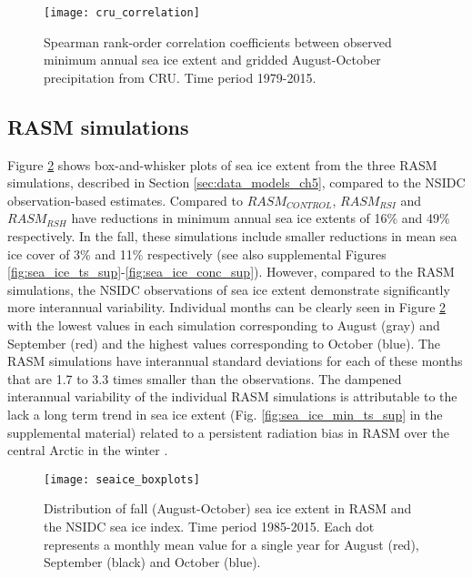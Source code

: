 \begin{figure}
  \centering
  \texttt{[image: cru\_correlation]}
  \caption{Spearman rank-order correlation coefficients between observed minimum annual sea ice extent and gridded August-October precipitation from CRU. Time period 1979-2015.}
  \label{fig:prec_spatial_corr}
\end{figure}

\subsection{RASM simulations}
\label{sec:rasm_results}

Figure \ref{fig:sea_ice_box} shows box-and-whisker plots of sea ice extent from the three RASM simulations, described in Section \ref{sec:data_models_ch5}, compared to the NSIDC observation-based estimates.
Compared to $RASM_{CONTROL}$, $RASM_{RSI}$ and $RASM_{RSH}$ have reductions in minimum annual sea ice extents of 16\% and 49\% respectively.
In the fall, these simulations include smaller reductions in mean sea ice cover of 3\% and 11\% respectively (see also supplemental Figures \ref{fig:sea_ice_ts_sup}-\ref{fig:sea_ice_conc_sup}). %
However, compared to the RASM simulations, the NSIDC observations of sea ice extent demonstrate significantly more interannual variability.
Individual months can be clearly seen in Figure \ref{fig:sea_ice_box} with the lowest values in each simulation corresponding to August (gray) and September (red) and the highest values corresponding to October (blue).
The RASM simulations have interannual standard deviations for each of these months that are 1.7 to 3.3 times smaller than the observations.
The dampened interannual variability of the individual RASM simulations is attributable to the lack a long term trend in sea ice extent (Fig. \ref{fig:sea_ice_min_ts_sup} in the supplemental material) related to a persistent radiation bias in RASM over the central Arctic in the winter \citep{Cassano_2016}.

\begin{figure}
  \centering
  \texttt{[image: seaice\_boxplots]}
  \caption{Distribution of fall (August-October) sea ice extent in RASM and the NSIDC sea ice index. Time period 1985-2015. Each dot represents a monthly mean value for a single year for August (red), September (black) and October (blue).}
  \label{fig:sea_ice_box}
\end{figure}

